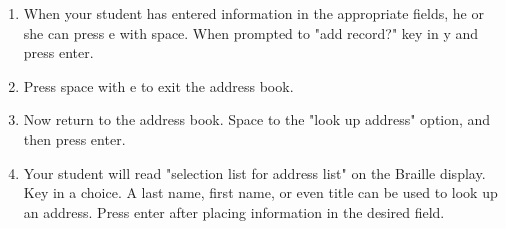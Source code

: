 \documentclass[10pt,letterpaper,twoside]{report}
\begin{document}
{{{{\begin{enumerate}
\begin{enumerate}
		      \item State
		            
		      \item Zip or postal code
		            
		      \item State
		            
		      \item Country
		            
		      \item Business title
		            
		      \item Company name
		            
		      \item Department
		            
		      \item Business street address
		            
		      \item Business state
		            
		      \item Business zip
		            
		      \item Business country
		            
		      \item Web page
		            
		      \item Notes
		            
		            
		            
		            
	      \end{enumerate}
	\item When your student has entered information in the appropriate fields, he or she can press e with space. When prompted to "add record?" key in y and press enter.
	      
	\item Press space with e to exit the address book.
	      
	\item Now return to the address book.  Space to the "look up address" option, and then press enter.
	      
	\item Your student will read "selection list for address list" on the Braille display.  Key in a choice.  A last name, first name, or even title can be used to look up an address.  Press enter after placing information in the desired field.
	      

\end{enumerate}}}}}
\end{document}
